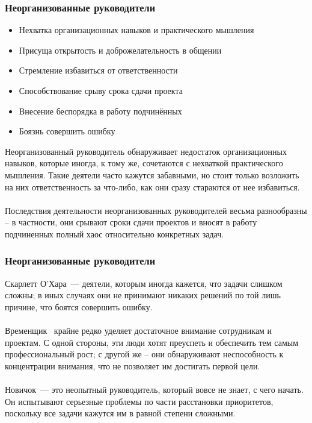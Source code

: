 \documentclass{../industrial-development}
\begin{document}
\begin{frame} \frametitle{Неорганизованные руководители}
	\begin{itemize}
		\item Нехватка организационных навыков и практического мышления
		\item Присуща открытость и доброжелательность в общении
		\item Стремление избавиться от ответственности
		\item Способствование срыву срока сдачи проекта
		\item Внесение беспорядка в работу подчинённых
		\item Боязнь совершить ошибку
		
	\end{itemize}
\end{frame}
\lecturenotes
Неорганизованный руководитель обнаруживает недостаток организационных навыков, которые иногда, к тому же, сочетаются с нехваткой практического мышления. Такие деятели часто кажутся забавными, но стоит только возложить на них ответственность за что-либо, как они сразу стараются от нее избавиться. \\~\\
Последствия деятельности неорганизованных руководителей весьма разнообразны – в частности, они срывают сроки сдачи проектов и вносят в работу подчиненных полный хаос относительно конкретных задач. \\


\begin{frame} \frametitle{Неорганизованные руководители}
	 \alert{Скарлетт О'Хара}~— деятели, которым иногда кажется, что задачи слишком сложны; в иных случаях они не принимают никаких решений по той лишь причине, что боятся совершить ошибку.\\~\\
\alert{Временщик}~ крайне редко уделяет достаточное внимание сотрудникам и проектам. С одной стороны, эти люди хотят преуспеть и обеспечить тем самым профессиональный рост; с другой же – они обнаруживают неспособность к концентрации внимания, что не позволяет им достигать первой цели. 
\\~\\
\alert{Новичок}~— это неопытный руководитель, который вовсе не знает, с чего начать. Он испытывают серьезные проблемы по части расстановки приоритетов, поскольку все задачи кажутся им в равной степени сложными.
\\
\end{frame}
\lecturenotes
\end{document}
